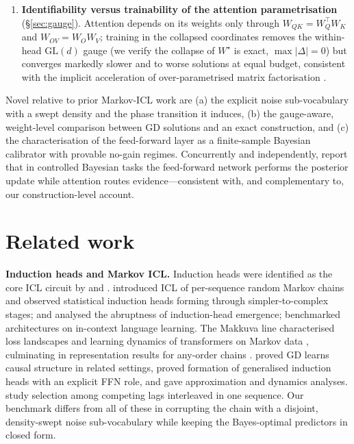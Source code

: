 \documentclass{article} %
\newcommand{\Wstar}{W^{\star}}
\newcommand{\WQK}{W_{QK}}
\newcommand{\WOV}{W_{OV}}
\begin{document}
\begin{enumerate}
(Proposition~\ref{prop:dirichlet}); an unequal-successor variant of the benchmark
confirms the prediction empirically.
\item \textbf{Identifiability versus trainability of the attention parametrisation}
(\S\ref{sec:gauge}). Attention depends on its weights only through
$\WQK=W_Q^{\top}W_K$ and $\WOV=W_OW_V$; training in the collapsed coordinates removes
the within-head $\mathrm{GL}(d)$ gauge (we verify the collapse of $\Wstar$ is exact,
$\max|\Delta|=0$) but converges markedly slower and to worse solutions at equal
budget, consistent with the implicit acceleration of over-parametrised matrix
factorisation \citep{arora2018optimization,kobayashi2024weight}.
\end{enumerate}

Novel relative to prior Markov-ICL work are (a) the explicit noise sub-vocabulary
with a swept density and the phase transition it induces, (b) the gauge-aware,
weight-level comparison between GD solutions and an exact construction, and (c) the
characterisation of the feed-forward layer as a finite-sample Bayesian calibrator
with provable no-gain regimes. Concurrently and independently,
\citet{agarwal2025bayesian} report that in controlled Bayesian tasks the feed-forward
network performs the posterior update while attention routes evidence---consistent
with, and complementary to, our construction-level account.

\section{Related work}
\label{sec:related}

\textbf{Induction heads and Markov ICL.} Induction heads were identified as the core
ICL circuit by \citet{elhage2021mathematical} and \citet{olsson2022context}.
\citet{edelman2024evolution} introduced ICL of per-sequence random Markov chains and
observed statistical induction heads forming through simpler-to-complex stages;
\citet{bietti2023birth} and \citet{reddy2024mechanistic} analysed the abruptness of
induction-head emergence; \citet{akyurek2024incontext} benchmarked architectures on
in-context language learning. The Makkuva line characterised loss landscapes and
learning dynamics of transformers on Markov data
\citep{makkuva2024attention,makkuva2024local}, culminating in representation results
for any-order chains \citep{rajaraman2024transformers,ekbote2025what}.
\citet{nichani2024transformers} proved GD learns causal structure in related settings,
\citet{chen2024unveiling} proved formation of generalised induction heads with an
explicit FFN role, and \citet{wang2024how} gave approximation and dynamics analyses.
\citet{dangelo2025selective} study selection among competing lags interleaved in one
sequence. Our benchmark differs from all of these in corrupting the chain with a
disjoint, density-swept noise sub-vocabulary while keeping the Bayes-optimal
predictors in closed form.
\end{document}
